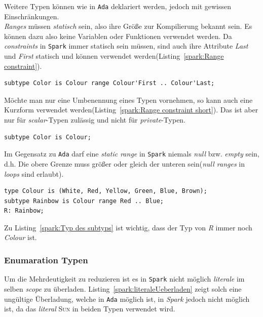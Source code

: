 Weitere Typen können wie in \texttt{Ada} deklariert werden, jedoch mit gewissen Einschränkungen.\\
\textit{Ranges} müssen \textit{statisch} sein, also ihre Größe zur Kompilierung bekannt sein. Es können dazu also keine Variablen oder Funktionen verwendet werden. Da \textit{constraints} in \texttt{Spark} immer statisch sein müssen, sind auch ihre Attribute \textit{Last} und \textit{First} statisch und können verwendet werden(Listing~\ref{spark:Range constraint}).

\begin{lstlisting}[caption={Range constraint}, label=spark:Range constraint]
subtype Color is Colour range Colour'First .. Colour'Last;
\end{lstlisting}

Möchte man nur eine Umbenennung eines Typen vornehmen, so kann auch eine Kurzform verwendet werden(Listing~\ref{spark:Range constraint short}). Das ist aber nur für \textit{scalar}-Typen zulässig und nicht für \textit{private}-Typen.

\begin{lstlisting}[caption={Range constraint kurz}, label=spark:Range constraint short]
subtype Color is Colour;
\end{lstlisting}

Im Gegensatz zu \texttt{Ada} darf eine \textit{static range} in \texttt{Spark} niemals \textit{null} bzw. \textit{empty} sein, d.h. Die obere Grenze muss größer oder gleich der unteren sein(\textit{null ranges} in \textit{loops} sind erlaubt).

\begin{lstlisting}[caption={Typ des subtyps}, label=spark:Typ des subtyps]
type Colour is (White, Red, Yellow, Green, Blue, Brown);
subtype Rainbow is Colour range Red .. Blue;
R: Rainbow;
\end{lstlisting}

Zu Listing~\ref{spark:Typ des subtyps} ist wichtig, dass der Typ von \textit{R} immer noch \textit{Colour} ist.



\subsubsection{Enumaration Typen}
\label{subsubsec:EnumarationTypen}
Um die Mehrdeutigkeit zu reduzieren ist es in \texttt{Spark} nicht möglich \textit{literale} im selben \textit{scope} zu überladen. Listing~\ref{spark:literaleUeberladen} zeigt solch eine ungültige Überladung, welche in \texttt{Ada} möglich ist, in \textit{Spark} jedoch nicht möglich ist, da das \textit{literal} \textsc{Sun} in beiden Typen verwendet wird.

